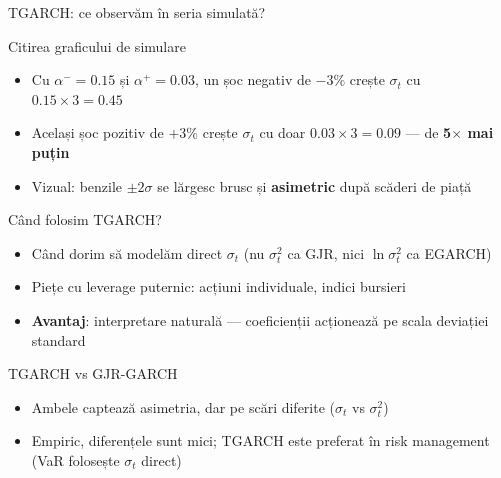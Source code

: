 \documentclass[9pt, aspectratio=169, t]{beamer}
\begin{document}
\begin{frame}{TGARCH: ce observăm în seria simulată?}
    \small
        \begin{block}{Citirea graficului de simulare}
            \begin{itemize}
                \item Cu $\alpha^- = 0.15$ și $\alpha^+ = 0.03$, un șoc negativ de $-3\%$ crește $\sigma_t$ cu $0.15 \times 3 = 0.45$
                \item Același șoc pozitiv de $+3\%$ crește $\sigma_t$ cu doar $0.03 \times 3 = 0.09$ --- de \textbf{5$\times$ mai puțin}
                \item Vizual: benzile $\pm 2\sigma$ se lărgesc brusc și \textbf{asimetric} după scăderi de piață
            \end{itemize}
        \end{block}
        \begin{exampleblock}{Când folosim TGARCH?}
            \begin{itemize}
                \item Când dorim să modelăm direct $\sigma_t$ (nu $\sigma_t^2$ ca GJR, nici $\ln\sigma_t^2$ ca EGARCH)
                \item Piețe cu leverage puternic: acțiuni individuale, indici bursieri
                \item \textbf{Avantaj}: interpretare naturală --- coeficienții acționează pe scala deviației standard
            \end{itemize}
        \end{exampleblock}
        \begin{alertblock}{TGARCH vs GJR-GARCH}
            \begin{itemize}
                \item Ambele captează asimetria, dar pe scări diferite ($\sigma_t$ vs $\sigma_t^2$)
                \item Empiric, diferențele sunt mici; TGARCH este preferat în risk management (VaR folosește $\sigma_t$ direct)
            \end{itemize}
        \end{alertblock}
\end{frame}
\end{document}
